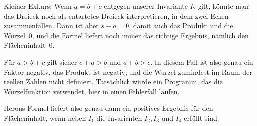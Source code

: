 Kleiner Exkurs: Wenn $a=b+c$ entgegen unserer Invariante $I_2$ gilt, könnte man das Dreieck noch als entartetes Dreieck interpretieren, in dem zwei Ecken zusammen\-fallen. Dann ist aber $s-a=0$, damit auch das Produkt und die Wurzel~0, und die Formel liefert noch immer das richtige Ergebnis, nämlich den Flächeninhalt~0. 

Für $a>b+c$ gilt sicher $c+a>b$ und $a+b>c$. In diesem Fall ist also genau ein Faktor negativ, das Produkt ist negativ, und die Wurzel zumindest im Raum der reellen Zahlen nicht definiert. Tatsächlich würde ein Programm, das die Wurzelfunktion verwendet, hier in einen Fehlerfall laufen.
	
Herons Formel liefert also genau dann ein positives Ergebnis für den Flächeninhalt, wenn neben $I_1$ die Invarianten $I_2, I_3$ und $I_4$ erfüllt sind.
